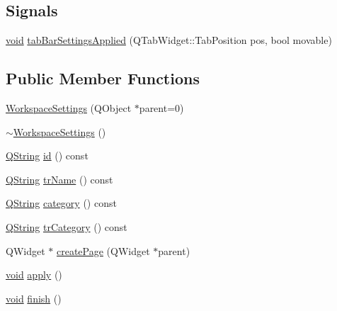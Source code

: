 \subsection*{Signals}
\begin{DoxyCompactItemize}
\item 
\hyperlink{group___u_a_v_objects_plugin_ga444cf2ff3f0ecbe028adce838d373f5c}{void} \hyperlink{group___core_plugin_ga7fbca5cfb84fd54afed52b4ca319f887}{tab\-Bar\-Settings\-Applied} (Q\-Tab\-Widget\-::\-Tab\-Position pos, bool movable)
\end{DoxyCompactItemize}
\subsection*{Public Member Functions}
\begin{DoxyCompactItemize}
\item 
\hyperlink{group___core_plugin_ga17c90a13ced98ccf424faf0ffe0a9b83}{Workspace\-Settings} (Q\-Object $\ast$parent=0)
\item 
\hyperlink{group___core_plugin_ga52cc2565aaed4f3542cdeba23e41648f}{$\sim$\-Workspace\-Settings} ()
\item 
\hyperlink{group___u_a_v_objects_plugin_gab9d252f49c333c94a72f97ce3105a32d}{Q\-String} \hyperlink{group___core_plugin_ga71ed1ecbadd60bd6d4bb544942aede25}{id} () const 
\item 
\hyperlink{group___u_a_v_objects_plugin_gab9d252f49c333c94a72f97ce3105a32d}{Q\-String} \hyperlink{group___core_plugin_gab9597c172a3c0a1ae683edb4c4a3d8c2}{tr\-Name} () const 
\item 
\hyperlink{group___u_a_v_objects_plugin_gab9d252f49c333c94a72f97ce3105a32d}{Q\-String} \hyperlink{group___core_plugin_ga09ec0904c7d7ef400eb3251043b2520e}{category} () const 
\item 
\hyperlink{group___u_a_v_objects_plugin_gab9d252f49c333c94a72f97ce3105a32d}{Q\-String} \hyperlink{group___core_plugin_ga8ecc36dbd81d6713a27af883d0ae089d}{tr\-Category} () const 
\item 
Q\-Widget $\ast$ \hyperlink{group___core_plugin_gabe793109d2a56ccf3f1b1b818f4ae7e3}{create\-Page} (Q\-Widget $\ast$parent)
\item 
\hyperlink{group___u_a_v_objects_plugin_ga444cf2ff3f0ecbe028adce838d373f5c}{void} \hyperlink{group___core_plugin_gabfff6f413d139681a9bc4b6d750b2746}{apply} ()
\item 
\hyperlink{group___u_a_v_objects_plugin_ga444cf2ff3f0ecbe028adce838d373f5c}{void} \hyperlink{group___core_plugin_ga3bd655424af374ce67e8c9d36a2fef4c}{finish} ()

\end{DoxyCompactItemize}
